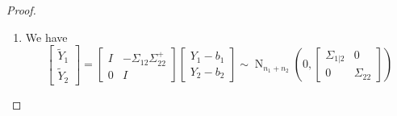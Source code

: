 \documentclass[12pt,a4paper]{amsart}
\newcommand{\gaussian}[3]{\operatorname{N}_{#1}\left(#2,#3\right)}
\theoremstyle{plain}%
\theoremstyle{definition}
\theoremstyle{remark}
\begin{document}
\begin{proof}
% 
\begin{enumerate}
\item 
We have
%
\begin{equation*}
  \begin{bmatrix}
    \widetilde Y_1 \\ \widetilde Y_2
  \end{bmatrix}
=
  \begin{bmatrix}
    I & -\Sigma_{12}\Sigma_{22}^+ \\ 0 & I
  \end{bmatrix}
  \begin{bmatrix}
    Y_1 - b_1 \\ Y_2 - b_2
  \end{bmatrix} \sim \gaussian {n_1+n_2} {0} {  \begin{bmatrix}
    \Sigma_{1|2} & 0 \\ 0 & \Sigma_{22}
  \end{bmatrix}
}
\end{equation*}


\end{enumerate}
\end{proof}
\end{document}

